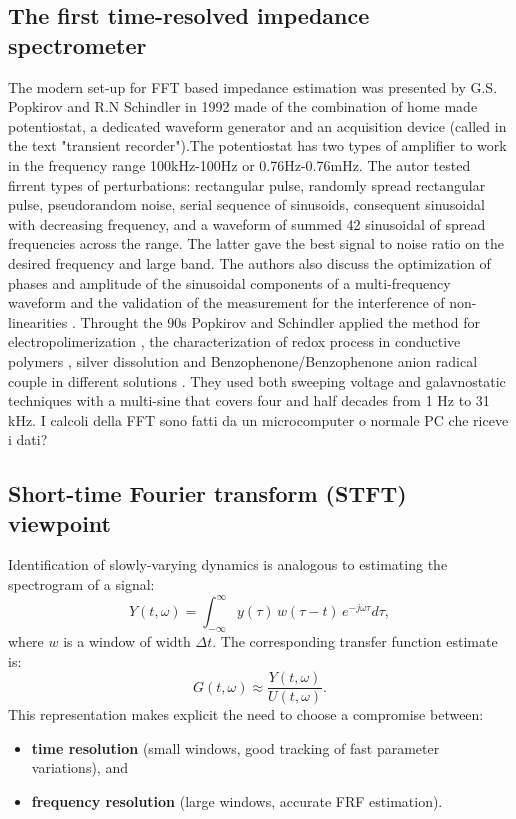 \subsection{The first time-resolved impedance spectrometer}
\label{sec:fft-eis}
The modern set-up for FFT based impedance estimation was presented by G.S. Popkirov and R.N Schindler in 1992 made of the combination of home made potentiostat, a dedicated waveform generator and an acquisition device (called in the text "transient recorder").The potentiostat has two types of amplifier to work in the frequency range 100kHz-100Hz or 0.76Hz-0.76mHz. The autor tested firrent types of perturbations: rectangular pulse, randomly spread rectangular pulse, pseudorandom noise, serial sequence of sinusoids, consequent sinusoidal with decreasing frequency, and a waveform of summed 42 sinusoidal of spread frequencies across the range. The latter gave the best signal to noise ratio on the desired frequency and large band. The authors also discuss the optimization of phases and amplitude of the sinusoidal components of a multi-frequency waveform \cite{popkirovOptimizationPerturbationSignal1993a} and the validation of the measurement for the interference of non-linearities \cite{popkirovValidationExperimentalData1993a} \cite{popkirovEffectSampleNonlinearity1995a}.
Throught the 90s Popkirov and Schindler applied the method for electropolimerization \cite{popkirovInSituTimeResolved1993}, the characterization of redox process in conductive polymers \cite{popkirovInsituImpedanceMeasurements1995} \cite{popkirovElectrochemicalImpedanceSpectroscopy1995} \cite{popkirovInvestigationConductingPolymer1997} \cite{garcia-belmonteDeterminationElectronicConductivity2003a}, silver dissolution \cite{popkirovElectrodePotentialRedistribution1995} \cite{baltrunasTimeEvolutionActive1997} and Benzophenone/Benzophenone anion radical couple in different solutions \cite{walczykInvestigationRedoxCouple1995}.
They used both sweeping voltage and galavnostatic techniques with a multi-sine that covers four and half decades from 1 Hz to 31 kHz.
I calcoli della FFT sono fatti da un microcomputer o normale PC che riceve i dati?

\subsection{Short-time Fourier transform (STFT) viewpoint}

Identification of slowly-varying dynamics is analogous to estimating the spectrogram of a signal:
\[
Y(t,\omega) = \int_{-\infty}^{\infty} y(\tau)\, w(\tau - t)\, e^{-j\omega \tau} d\tau,
\]
where $w$ is a window of width $\Delta t$. The corresponding transfer function estimate is:
\[
G(t,\omega) \approx \frac{Y(t,\omega)}{U(t,\omega)}.
\]
This representation makes explicit the need to choose a compromise between:
\begin{itemize}
\item \textbf{time resolution} (small windows, good tracking of fast parameter variations), and
\item \textbf{frequency resolution} (large windows, accurate FRF estimation).
\end{itemize}

